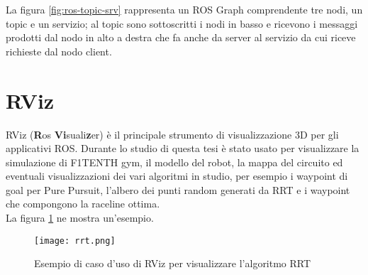 \bigskip

La figura \ref{fig:ros-topic-srv} rappresenta un ROS Graph comprendente tre nodi, un topic e un servizio;
al topic sono sottoscritti i nodi in basso e ricevono i messaggi prodotti dal nodo in alto a destra che
fa anche da server al servizio da cui riceve richieste dal nodo client.

\section{RViz}
\label{sec:rviz}
RViz (\textbf{R}os \textbf{Vi}suali\textbf{z}er) è il principale strumento di visualizzazione 3D per gli
applicativi ROS. Durante lo studio di questa tesi è stato usato per visualizzare la simulazione di
F1TENTH gym, il modello del robot, la mappa del circuito ed eventuali visualizzazioni dei vari algoritmi
in studio, per esempio i waypoint di goal per Pure Pursuit, l'albero dei punti random generati da RRT e i
waypoint che compongono la raceline ottima.\\
La figura \ref{fig:rviz-example} ne mostra un'esempio.

\begin{figure}[H]
	\centering
	\texttt{[image: rrt.png]}
	\caption{Esempio di caso d'uso di RViz per visualizzare l'algoritmo RRT}
	\label{fig:rviz-example}
\end{figure}
